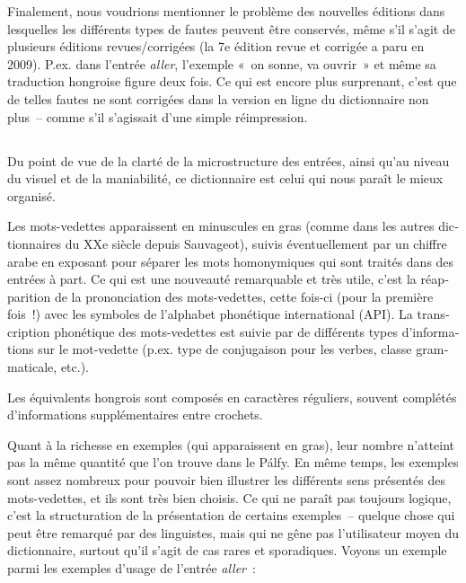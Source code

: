\documentclass[output=paper,colorlinks,citecolor=brown,arabicfont,chinesefont,booklanguage=french]{langscibook}
\begin{document}
\begin{otherlanguage}{french}
Finalement, nous voudrions mentionner le problème des nouvelles éditions dans lesquelles les différents types de fautes peuvent être conservés, même s’il s’agit de plusieurs éditions revues/corrigées (la 7e édition revue et corrigée a paru en 2009). P.ex. dans l’entrée \emph{aller}, l’exemple «~on sonne, va ouvrir~» et même sa traduction hongroise figure deux fois. Ce qui est encore plus surprenant, c’est que de telles fautes ne sont corrigées dans la version en ligne du dictionnaire non plus~-- comme s’il s’agissait d’une simple réimpression.

\subsection{ \citealt{BardosiSzabo2007} }\label{sec:tillinger:3.10}

Du point de vue de la clarté de la microstructure des entrées, ainsi qu’au niveau du visuel et de la maniabilité, ce dictionnaire est celui qui nous paraît le mieux organisé.

Les mots-vedettes apparaissent en minuscules en gras (comme dans les autres dictionnaires du XXe siècle depuis Sauvageot), suivis éventuellement par un chiffre arabe en exposant pour séparer les mots homonymiques qui sont traités dans des entrées à part. Ce qui est une nouveauté remarquable et très utile, c’est la réapparition de la prononciation des mots-vedettes, cette fois-ci (pour la première fois~!) avec les symboles de l’alphabet phonétique international (API). La transcription phonétique des mots-vedettes est suivie par de différents types d’informations sur le mot-vedette (p.ex. type de conjugaison pour les verbes, classe grammaticale, etc.). 

Les équivalents hongrois sont composés en caractères réguliers, souvent complétés d’informations supplémentaires entre crochets.

Quant à la richesse en exemples (qui apparaissent en gras), leur nombre n’atteint pas la même quantité que l’on trouve dans le Pálfy. En même temps, les exemples sont assez nombreux pour pouvoir bien illustrer les différents sens présentés des mots-vedettes, et ils sont très bien choisis. Ce qui ne paraît pas toujours logique, c’est la structuration de la présentation de certains exemples~-- quelque chose qui peut être remarqué par des linguistes, mais qui ne gêne pas l’utilisateur moyen du dictionnaire, surtout qu’il s’agit de cas rares et sporadiques. Voyons un exemple parmi les exemples d’usage de l’entrée \emph{aller}~:


\end{otherlanguage}
\end{document}
